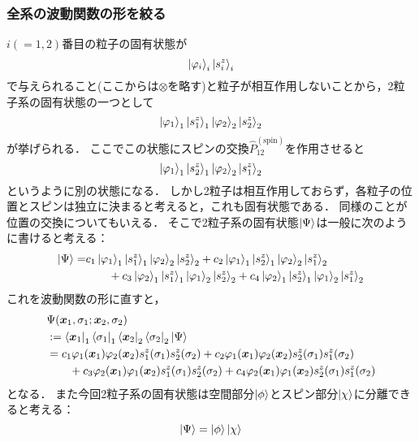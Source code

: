 \documentclass[a4paper,11pt]{jsarticle}
\begin{document}
\subsubsection{全系の波動関数の形を絞る}
$i(=1,2)$番目の粒子の固有状態が
\begin{equation}
  \ket{\varphi_i}_i\ket{s^z_i}_i
\end{equation}
で与えられること(ここからは$\otimes$を略す)と粒子が相互作用しないことから，2粒子系の固有状態の一つとして
\begin{equation}
  \ket{\varphi_1}_1\ket{s^z_1}_1\ket{\varphi_2}_2\ket{s^z_2}_2
\end{equation}
が挙げられる．
ここでこの状態にスピンの交換$\hat{P}^{(\mathrm{spin})}_{12}$を作用させると
\begin{equation}
  \ket{\varphi_1}_1\ket{s^z_2}_1\ket{\varphi_2}_2\ket{s^z_1}_2
\end{equation}
というように別の状態になる．
しかし2粒子は相互作用しておらず，各粒子の位置とスピンは独立に決まると考えると，これも固有状態である．
同様のことが位置の交換についてもいえる．
そこで2粒子系の固有状態$\ket{\Psi}$は一般に次のように書けると考える：
\begin{align}
  \ket{\Psi} = &c_1 \ket{\varphi_1}_1\ket{s^z_1}_1\ket{\varphi_2}_2\ket{s^z_2}_2 + c_2 \ket{\varphi_1}_1\ket{s^z_2}_1\ket{\varphi_2}_2\ket{s^z_1}_2 \notag\\ 
  &\qquad + c_3 \ket{\varphi_2}_1\ket{s^z_1}_1\ket{\varphi_1}_2\ket{s^z_2}_2 + c_4\ket{\varphi_2}_1\ket{s^z_2}_1\ket{\varphi_1}_2\ket{s^z_1}_2
\end{align}
これを波動関数の形に直すと，
\begin{align}
  &\Psi(\bm{x}_1, \sigma_1; \bm{x}_2, \sigma_2) \notag\\
  &:= \bra{\bm{x}_1}_1\bra{\sigma_1}_1\bra{\bm{x}_2}_2\bra{\sigma_2}_2 \ket{\Psi} \notag\\
  &= c_1 \varphi_1(\bm{x}_1) \varphi_2(\bm{x}_2) s^z_1(\sigma_1) s^z_2(\sigma_2) + c_2 \varphi_1(\bm{x}_1) \varphi_2(\bm{x}_2) s^z_2(\sigma_1) s^z_1(\sigma_2) \notag\\
  & \qquad + c_3 \varphi_2(\bm{x}_1) \varphi_1(\bm{x}_2) s^z_1(\sigma_1) s^z_2(\sigma_2) + c_4 \varphi_2(\bm{x}_1) \varphi_1(\bm{x}_2) s^z_2(\sigma_1) s^z_1(\sigma_2)
  \label{cseries}
\end{align}
となる．
また今回2粒子系の固有状態は空間部分$\ket{\phi}$とスピン部分$\ket{\chi}$に分離できると考える：
\begin{equation}
  \ket{\Psi} = \ket{\phi} \ket{\chi}
\end{equation}
\end{document}
